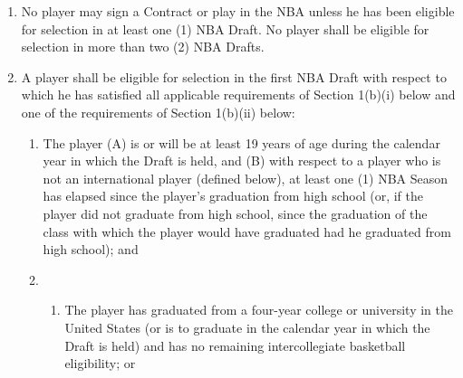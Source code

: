 \documentclass[
]{book}
\providecommand{\tightlist}{%
  \setlength{\itemsep}{0pt}\setlength{\parskip}{0pt}}
\begin{document}
\begin{enumerate}
\def\labelenumi{(\alph{enumi})}
\tightlist
\item
  No player may sign a Contract or play in the NBA unless he has been eligible for selection in at least one (1) NBA Draft. No player shall be eligible for selection in more than two (2) NBA Drafts.
\item
  A player shall be eligible for selection in the first NBA Draft with respect to which he has satisfied all applicable requirements of Section 1(b)(i) below and one of the requirements of Section 1(b)(ii) below:

  \begin{enumerate}
  \def\labelenumii{(\roman{enumii})}
  \item
    The player (A) is or will be at least 19 years of age during the calendar year in which the Draft is held, and (B) with respect to a player who is not an international player (defined below), at least one (1) NBA Season has elapsed since the player's graduation from high school (or, if the player did not graduate from high school, since the graduation of the class with which the player would have graduated had he graduated from high school); and
  \item
    \begin{enumerate}
    \def\labelenumiii{(\Alph{enumiii})}
    \tightlist
    \item
      The player has graduated from a four-year college or university in the United States (or is to graduate in the calendar year in which the Draft is held) and has no remaining intercollegiate basketball eligibility; or


\end{enumerate}
\end{enumerate}
\end{enumerate}
\end{document}
